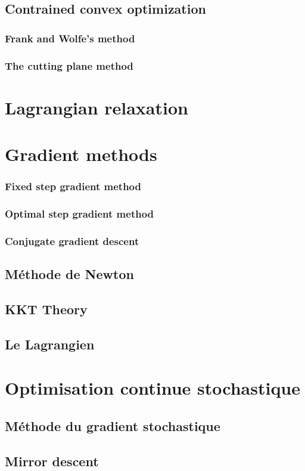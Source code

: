 \documentclass[12pt,openany,oneside]{book}
\begin{document}
\subsection{Contrained convex optimization}
\subsubsection{Frank and Wolfe's method}
\subsubsection{The cutting plane method}
\section{Lagrangian relaxation}
\section{Gradient methods}
\subsubsection{Fixed step gradient method}
\subsubsection{Optimal step gradient method}
\subsubsection{Conjugate gradient descent}
\subsection{Méthode de Newton}
\subsection{KKT Theory}
\subsection{Le Lagrangien}
\section{Optimisation continue stochastique}
\subsection{Méthode du gradient stochastique}
\subsection{Mirror descent}
\end{document}
